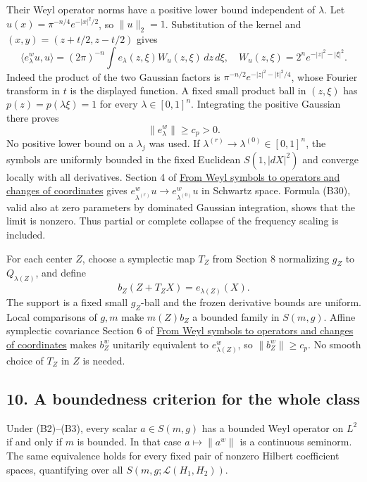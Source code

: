 \documentclass[
  11pt,
]{article}
\begin{document}
Their Weyl operator norms have a positive lower bound independent of
\(\lambda\). Let \(u(x)=\pi^{-n/4}e^{-|x|^2/2}\), so \(\|u\|_2=1\).
Substitution of the kernel and \((x,y)=(z+t/2,z-t/2)\) gives \[
 \langle e_\lambda^wu,u\rangle
 =(2\pi)^{-n}\int e_\lambda(z,\xi)W_u(z,\xi)\,dz\,d\xi,
 \quad W_u(z,\xi)=2^n e^{-|z|^2-|\xi|^2}.
 \tag{B30}
\] Indeed the product of the two Gaussian factors is
\(\pi^{-n/2}e^{-|z|^2-|t|^2/4}\), whose Fourier transform in \(t\) is
the displayed function. A fixed small product ball in \((z,\xi)\) has
\(p(z)=p(\lambda\xi)=1\) for every \(\lambda\in[0,1]^n\). Integrating
the positive Gaussian there proves \[
 \|e_\lambda^w\|\ge c_p>0.
 \tag{B31}
\] No positive lower bound on a \(\lambda_j\) was used. If
\(\lambda^{(r)}\to\lambda^{(0)}\in[0,1]^n\), the symbols are uniformly
bounded in the fixed Euclidean \(S(1,|dX|^2)\) and converge locally with
all derivatives. Section 4 of \href{weyl-covariance-action.pdf}{From Weyl
symbols to operators and changes of coordinates} gives
\(e_{\lambda^{(r)}}^wu\to e_{\lambda^{(0)}}^wu\) in Schwartz space.
Formula (B30), valid also at zero parameters by dominated Gaussian
integration, shows that the limit is nonzero. Thus partial or complete
collapse of the frequency scaling is included.

For each center \(Z\), choose a symplectic map \(T_Z\) from Section 8
normalizing \(g_Z\) to \(Q_{\lambda(Z)}\), and define \[
 b_Z(Z+T_ZX)=e_{\lambda(Z)}(X).
 \tag{B32}
\] The support is a fixed small \(g_Z\)-ball and the frozen derivative
bounds are uniform. Local comparisons of \(g,m\) make \(m(Z)b_Z\) a
bounded family in \(S(m,g)\). Affine symplectic covariance Section 6 of
\href{weyl-covariance-action.pdf}{From Weyl symbols to operators and
changes of coordinates} makes \(b_Z^w\) unitarily equivalent to
\(e_{\lambda(Z)}^w\), so \(\|b_Z^w\|\ge c_p\). No smooth choice of
\(T_Z\) in \(Z\) is needed.

\subsection{10. A boundedness criterion for the whole
class}\label{a-boundedness-criterion-for-the-whole-class}

Under (B2)--(B3), every scalar \(a\in S(m,g)\) has a bounded Weyl
operator on \(L^2\) if and only if \(m\) is bounded. In that case
\(a\mapsto\|a^w\|\) is a continuous seminorm. The same equivalence holds
for every fixed pair of nonzero Hilbert coefficient spaces, quantifying
over all \(S(m,g;\mathcal L(H_1,H_2))\).
\end{document}

